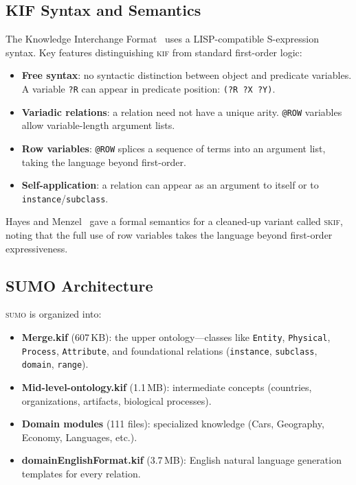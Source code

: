 \documentclass[11pt]{article}
\newcommand{\KIF}{\textsc{kif}}
\newcommand{\SUMO}{\textsc{sumo}}
\theoremstyle{definition}
\theoremstyle{plain}
\begin{document}
\subsection{KIF Syntax and Semantics}

The Knowledge Interchange Format~\cite{hayes-menzel-kif-2001} uses a
LISP-compatible S-expression syntax.
Key features distinguishing \KIF{} from standard first-order logic:
\begin{itemize}[nosep]
  \item \textbf{Free syntax}: no syntactic distinction between object
    and predicate variables.
    A variable \texttt{?R} can appear in predicate position:
    \texttt{(?R ?X ?Y)}.
  \item \textbf{Variadic relations}: a relation need not have a unique
    arity.
    \texttt{@ROW} variables allow variable-length argument lists.
  \item \textbf{Row variables}: \texttt{@ROW} splices a sequence of
    terms into an argument list, taking the language beyond first-order.
  \item \textbf{Self-application}: a relation can appear as an argument
    to itself or to \texttt{instance}/\texttt{subclass}.
\end{itemize}

Hayes and Menzel~\cite{hayes-menzel-kif-2001} gave a formal semantics
for a cleaned-up variant called \textsc{skif}, noting that the full use
of row variables takes the language beyond first-order expressiveness.

\subsection{SUMO Architecture}

\SUMO{} is organized into:
\begin{itemize}[nosep]
  \item \textbf{Merge.kif} (607\,KB): the upper ontology---classes like
    \texttt{Entity}, \texttt{Physical}, \texttt{Process},
    \texttt{Attribute}, and foundational relations
    (\texttt{instance}, \texttt{subclass}, \texttt{domain},
    \texttt{range}).
  \item \textbf{Mid-level-ontology.kif} (1.1\,MB): intermediate
    concepts (countries, organizations, artifacts, biological
    processes).
  \item \textbf{Domain modules} (111 files): specialized knowledge
    (Cars, Geography, Economy, Languages, etc.).
  \item \textbf{domainEnglishFormat.kif} (3.7\,MB): English natural
    language generation templates for every relation.
\end{itemize}
\end{document}
